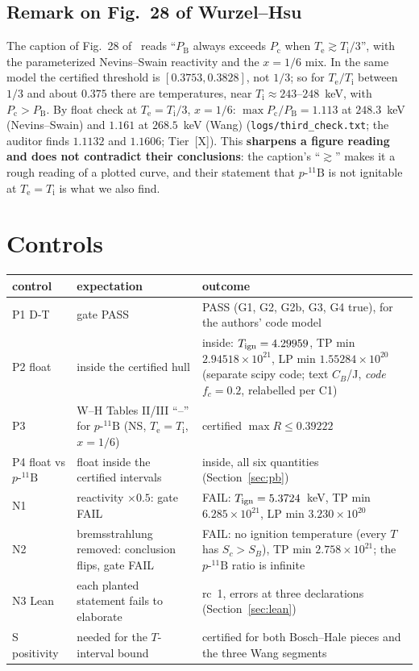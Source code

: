 \documentclass[10pt]{article}
\newcommand{\tier}[1]{\textsf{[#1]}}
\newcommand{\tX}{\tier{X}}
\newcommand{\Te}{T_{\mathrm e}}
\newcommand{\Ti}{T_{\mathrm i}}
\newcommand{\pB}{p\text{-}{}^{11}\mathrm{B}}
\newcommand{\Pc}{P_{\mathrm c}}
\newcommand{\PB}{P_{\mathrm B}}
\begin{document}
\subsection{Remark on Fig.~28 of Wurzel--Hsu}
The caption of Fig.~28 of~\cite{wh} reads ``$\PB$ always exceeds $\Pc$ when $\Te\gtrsim\Ti/3$'', with the parameterized Nevins--Swain reactivity and the $x=1/6$ mix. In the same model the certified threshold is $[0.3753,0.3828]$, not $1/3$; so for $\Te/\Ti$ between $1/3$ and about $0.375$ there are temperatures, near $\Ti\approx243$--$248$~keV, with $\Pc>\PB$. By float check at $\Te=\Ti/3$, $x=1/6$: $\max\Pc/\PB=1.113$ at $248.3$~keV (Nevins--Swain) and $1.161$ at $268.5$~keV (Wang) (\texttt{logs/third\_check.txt}; the auditor finds $1.1132$ and $1.1606$; Tier~\tX{}). This \textbf{sharpens a figure reading and does not contradict their conclusions}: the caption's ``$\gtrsim$'' makes it a rough reading of a plotted curve, and their statement that $\pB$ is not ignitable at $\Te=\Ti$ is what we also find.

\section{Controls}\label{sec:controls}
\begin{center}\small\begin{tabular}{p{2.0cm}p{5.4cm}p{8.0cm}}\toprule
control & expectation & outcome\\\midrule
P1 D-T & gate PASS & PASS (G1, G2, G2b, G3, G4 true), for the authors' code model\\
P2 float & inside the certified hull & inside: $T_{\rm ign}=4.29959$, TP min $2.94518\times10^{21}$, LP min $1.55284\times10^{20}$ (separate scipy code; text $C_B$/J, \emph{code} $f_c=0.2$, relabelled per C1)\\
P3 & W--H Tables II/III ``--'' for $\pB$ (NS, $\Te=\Ti$, $x=1/6$) & certified $\max R\le0.39222$\\
P4 float vs $\pB$ & float inside the certified intervals & inside, all six quantities (Section~\ref{sec:pb})\\
N1 & reactivity $\times0.5$: gate FAIL & FAIL: $T_{\rm ign}=5.3724$~keV, TP min $6.285\times10^{21}$, LP min $3.230\times10^{20}$\\
N2 & bremsstrahlung removed: conclusion flips, gate FAIL & FAIL: no ignition temperature (every $T$ has $S_c>S_B$), TP min $2.758\times10^{21}$; the $\pB$ ratio is infinite\\
N3 Lean & each planted statement fails to elaborate & rc~1, errors at three declarations (Section~\ref{sec:lean})\\
S positivity & needed for the $T$-interval bound & certified for both Bosch--Hale pieces and the three Wang segments\\\bottomrule
\end{tabular}\end{center}
\end{document}
